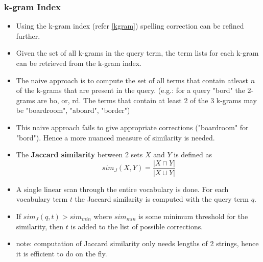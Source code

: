 \documentclass{article}
\begin{document}
\subsubsection{k-gram Index}
\begin{itemize}
    \item Using the k-gram index (refer \ref{kgram}) spelling correction can be refined further. 
    
    \item Given the set of all k-grams in the query term, the term lists for each k-gram can be retrieved from the k-gram index. 
    
    \item The naive approach is to compute the set of all terms that contain atleast $n$ of the k-grams that are present in the query. (e.g.: for a query "bord" the 2-grams are bo, or, rd. The terms that contain at least 2 of the 3 k-grams may be "boardroom", "aboard", "border")
    
    \item This naive approach fails to give appropriate corrections ("boardroom" for "bord"). Hence a more nuanced measure of similarity is needed. 
    
    \item The \textbf{Jaccard similarity} between 2 sets $X$ and $Y$ is defined as
    \begin{equation}
        sim_J(X, Y) = \frac{|X \cap Y|}{|X \cup Y|}
    \end{equation}
    
    \item A single linear scan through the entire vocabulary is done. For each vocabulary term $t$ the Jaccard similarity is computed with the query term $q$.
    
    \item If $sim_J(q, t) > sim_{min}$ where $sim_{min}$ is some minimum threshold for the similarity, then $t$ is added to the list of possible corrections. 
    
    \item note: computation of Jaccard similarity only needs lengths of 2 strings, hence it is efficient to do on the fly. 
\end{itemize}
\end{document}
